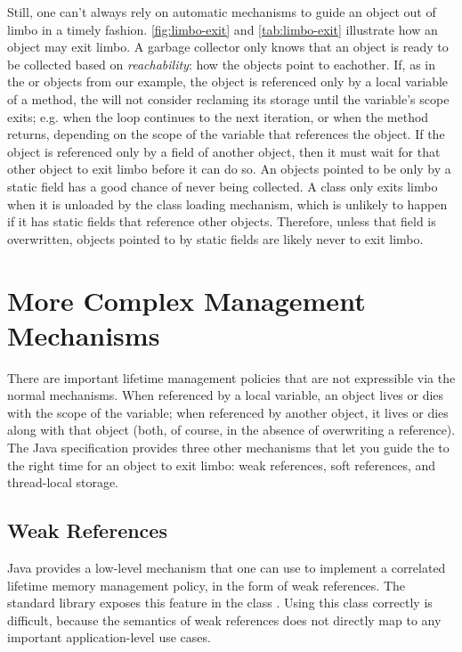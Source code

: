 Still, one can't always rely on automatic mechanisms to guide an object out of
limbo in a timely fashion.
\autoref{fig:limbo-exit} and \autoref{tab:limbo-exit}
illustrate how an object may exit limbo. 
A garbage collector only knows that an object is ready to
be collected based on {\em reachability}: how the objects point to eachother.
If, as in the 
or  objects from our example, the object is referenced
only by a local variable of a method, the \jre will not consider reclaming its
storage until the variable's scope exits; e.g. when the loop continues to the
next iteration, or when the method returns, depending on the scope of the
variable that references the object. If the object is referenced only by a
field of another object, then it must wait for that other object to exit limbo
before it can do so. 
An objects pointed to be only by a static field has a good chance of never
being collected. A class only exits limbo when it is unloaded by the \jres
class loading mechanism, which is unlikely to happen if it has static fields
that reference other objects. Therefore, unless that field is overwritten,
objects pointed to by static fields are likely never to exit limbo.

\section{More Complex Management Mechanisms}
There are important lifetime management policies that are not expressible via the
normal mechanisms. When referenced by a local variable, an object lives or dies
with the scope of the variable; when referenced by another object, it lives or
dies along with that object (both, of course, in the absence of overwriting a
reference). The Java specification provides three other mechanisms that let you
guide the \jre to the right time for an object to exit limbo: weak references,
soft references, and thread-local storage.

\subsection{Weak References}

Java provides a low-level mechanism that one can use to implement a
correlated lifetime memory management policy, in the form of weak references.
The standard library exposes this feature in the class
. Using this class correctly is
difficult, because the semantics of weak references does not directly map to
any important application-level use cases.

